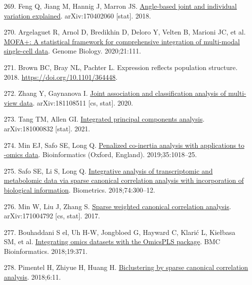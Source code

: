 \documentclass[
  12pt,
  a4paper,
  twoside,
  openright]{book}
\newlength{\cslhangindent}
\newlength{\cslentryspacingunit} %
\newenvironment{CSLReferences}[2] %
 {%
  \setlength{\parindent}{0pt}
  \ifodd #1
  \let\oldpar\par
  \def\par{\hangindent=\cslhangindent\oldpar}
  \fi
  \setlength{\parskip}{#2\cslentryspacingunit}
 }%
 {}
\begin{document}
\begin{CSLReferences}{0}{0}
\leavevmode{}%
269. Feng Q, Jiang M, Hannig J, Marron JS. \href{http://arxiv.org/abs/1704.02060}{Angle-based joint and individual variation explained}. arXiv:170402060 {[}stat{]}. 2018.

\leavevmode{}%
270. Argelaguet R, Arnol D, Bredikhin D, Deloro Y, Velten B, Marioni JC, et al. \href{https://doi.org/10.1186/s13059-020-02015-1}{MOFA+: A statistical framework for comprehensive integration of multi-modal single-cell data}. Genome Biology. 2020;21:111.

\leavevmode{}%
271. Brown BC, Bray NL, Pachter L. Expression reflects population structure. 2018. \url{https://doi.org/10.1101/364448}.

\leavevmode{}%
272. Zhang Y, Gaynanova I. \href{http://arxiv.org/abs/1811.08511}{Joint association and classification analysis of multi-view data}. arXiv:181108511 {[}cs, stat{]}. 2020.

\leavevmode{}%
273. Tang TM, Allen GI. \href{http://arxiv.org/abs/1810.00832}{Integrated principal components analysis}. arXiv:181000832 {[}stat{]}. 2021.

\leavevmode{}%
274. Min EJ, Safo SE, Long Q. \href{https://doi.org/10.1093/bioinformatics/bty726}{Penalized co-inertia analysis with applications to -omics data}. Bioinformatics (Oxford, England). 2019;35:1018--25.

\leavevmode{}%
275. Safo SE, Li S, Long Q. \href{https://doi.org/10.1111/biom.12715}{Integrative analysis of transcriptomic and metabolomic data via sparse canonical correlation analysis with incorporation of biological information}. Biometrics. 2018;74:300--12.

\leavevmode{}%
276. Min W, Liu J, Zhang S. \href{http://arxiv.org/abs/1710.04792}{Sparse weighted canonical correlation analysis}. arXiv:171004792 {[}cs, stat{]}. 2017.

\leavevmode{}%
277. Bouhaddani S el, Uh H-W, Jongbloed G, Hayward C, Klarić L, Kiełbasa SM, et al. \href{https://doi.org/10.1186/s12859-018-2371-3}{Integrating omics datasets with the OmicsPLS package}. BMC Bioinformatics. 2018;19:371.

\leavevmode{}%
278. Pimentel H, Zhiyue H, Huang H. \href{https://doi.org/10.1007/s40484-017-0127-0}{Biclustering by sparse canonical correlation analysis}. 2018;6:11.


\end{CSLReferences}
\end{document}
